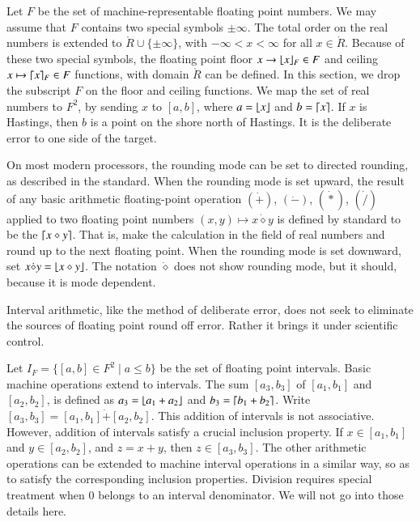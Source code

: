 Let $F$ be the set of machine-representable floating point numbers.  We may assume that $F$ contains two 
 special symbols $\pm\infty$.  The total order on the real numbers is extended to $\ring{R}\cup\{\pm\infty\}$, with $-\infty < x < \infty$ for all $x\in\ring{R}$.
Because of these two special symbols, the floating point floor $x\to\lfloor x\rfloor_F\in F$ and ceiling $x\mapsto\lceil x\rceil_F\in F$ functions, with domain $\ring{R}$ can be defined.   In this section, we drop the subscript $F$ on the
floor and ceiling functions.
We map the set of real numbers to $F^2$, by
sending $x$ to $[a,b]$, where $a = \lfloor x\rfloor$ and $b=\lceil x\rceil$.
If $x$ is Hastings, then $b$ is a point
on the shore north of Hastings.  It is the deliberate error to one side of the target.  





On most modern processors, the rounding mode can be set to directed rounding, as
described in the standard.   When the rounding mode is set upward, the result of
any basic arithmetic floating-point operation $(\dot +)$, $(\dot -)$, $(\dot *)$, $(\dot /)$ applied to two floating
point numbers $(x,y)\mapsto x\dot\diamond y$ is defined by standard to be 
the $\lceil x\diamond y\rceil$.  That is, make the calculation in the field of real numbers and round up to the next floating point.
When the rounding mode is set downward, 
set $x\dot\diamond y = \lfloor x\diamond y\rfloor$.  The notation $\dot\diamond$ does not
show rounding mode, but it should, because it is mode dependent.


Interval arithmetic, like the method of deliberate error, does not seek to eliminate
the sources of floating point round off error.  Rather it brings it under scientific
control.  


Let $I_F = \{[a,b] \in F^2 \mid a \le b\}$ be the set of floating point intervals.
Basic machine operations extend to intervals.  The sum $[a_3,b_3]$ of
$[a_1,b_1]$ and $[a_2,b_2]$, is defined as $a_3=\lfloor a_1+a_2\rfloor$ and
$b_3 = \lceil b_1+b_2\rceil$.  Write $[a_3,b_3] = [a_1,b_1] \dot+ [a_2,b_2]$.
This addition of intervals
is not associative.  However, addition of intervals satisfy a crucial inclusion property.
If $x\in[a_1,b_1]$ and $y\in [a_2,b_2]$, and $z = x+y$,
then $z\in [a_3,b_3]$.  The other arithmetic operations can be extended to machine
interval operations in a similar way, so as to satisfy the corresponding inclusion
properties.    Division requires special treatment when $0$ belongs to an interval
denominator.  We will not go into those details here.  

